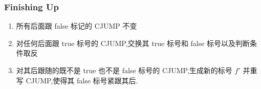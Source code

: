 \subsubsection{Finishing Up}
\begin{enumerate}
    \item 所有后面跟 false 标记的 CJUMP 不变
    \item 对任何后面跟 true 标号的 CJUMP,交换其 true 标号和 false 标号以及判断条件取反
    \item 对其后跟随的既不是 true 也不是 false 标号的 CJUMP,生成新的标号 $f'$ 并重写 CJUMP,使得其 false 标号紧跟其后.
\end{enumerate}
